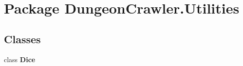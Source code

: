 \hypertarget{namespace_dungeon_crawler_1_1_utilities}{}\section{Package Dungeon\+Crawler.\+Utilities}
\label{namespace_dungeon_crawler_1_1_utilities}
\subsection*{Classes}
\begin{DoxyCompactItemize}
\item 
class {\bfseries Dice}
\end{DoxyCompactItemize}

